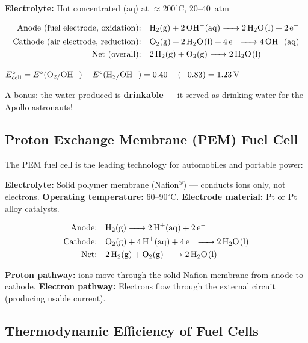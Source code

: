 \begin{conceptbox}
\textbf{Electrolyte:} Hot concentrated (aq) at $\approx200^\circ\text{C}$, 20--40~atm

\begin{align*}
\text{Anode (fuel electrode, oxidation):}& \quad \ce{H2(g) + 2OH-(aq) -> 2H2O(l) + 2e-}\\
\text{Cathode (air electrode, reduction):}& \quad \ce{O2(g) + 2H2O(l) + 4e- -> 4OH-(aq)}\\
\text{Net (overall):}& \quad \ce{2H2(g) + O2(g) -> 2H2O(l)}
\end{align*}

$E^\circ_{\text{cell}} = E^\circ(\ce{O2/OH-}) - E^\circ(\ce{H2/OH-}) = 0.40 - (-0.83) = 1.23\,\text{V}$

A bonus: the water produced is \textbf{drinkable} --- it served as drinking water for the Apollo astronauts!
\end{conceptbox}

\subsection{Proton Exchange Membrane (PEM) Fuel Cell}

The PEM fuel cell is the leading technology for automobiles and portable power:

\begin{conceptbox}
\textbf{Electrolyte:} Solid polymer membrane (Nafion$^\circledR$) --- conducts  ions only, not electrons.
\textbf{Operating temperature:} $60\text{--}90^\circ\text{C}$.
\textbf{Electrode material:} Pt or Pt alloy catalysts.

\begin{align*}
\text{Anode:}& \quad \ce{H2(g) -> 2H+(aq) + 2e-}\\
\text{Cathode:}& \quad \ce{O2(g) + 4H+(aq) + 4e- -> 2H2O(l)}\\
\text{Net:}& \quad \ce{2H2(g) + O2(g) -> 2H2O(l)}
\end{align*}

\textbf{Proton pathway:}  ions move through the solid Nafion membrane from anode to cathode.
\textbf{Electron pathway:} Electrons flow through the external circuit (producing usable current).
\end{conceptbox}

\subsection{Thermodynamic Efficiency of Fuel Cells}

